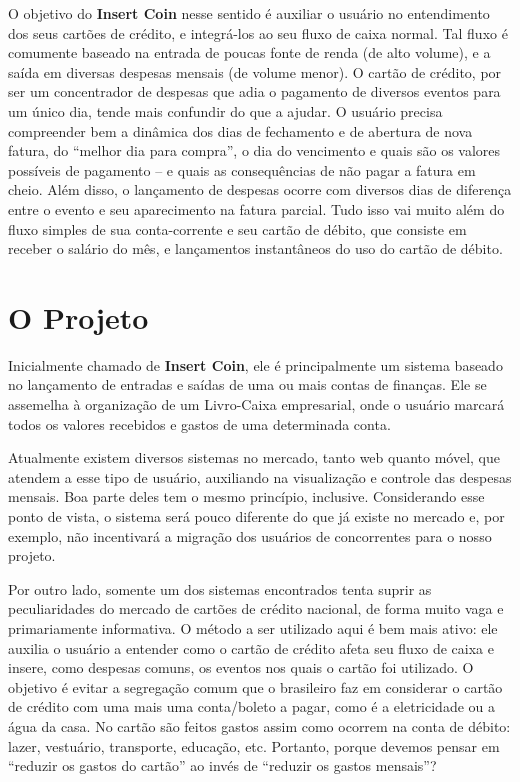 \documentclass[a4paper]{abnt}
\begin{document}
O objetivo do \textbf{Insert Coin} nesse sentido é auxiliar o usuário no entendimento dos seus cartões de crédito, e integrá-los ao seu fluxo de caixa normal. Tal fluxo é comumente baseado na entrada de poucas fonte de renda (de alto volume), e a saída em diversas despesas mensais (de volume menor). O cartão de crédito, por ser um concentrador de despesas que adia o pagamento de diversos eventos para um único dia, tende mais confundir do que a ajudar. O usuário precisa compreender bem a dinâmica dos dias de fechamento e de abertura de nova fatura, do “melhor dia para compra”, o dia do vencimento e quais são os valores possíveis de pagamento – e quais as consequências de não pagar a fatura em cheio. Além disso, o lançamento de despesas ocorre com diversos dias de diferença entre o evento e seu aparecimento na fatura parcial. Tudo isso vai muito além do fluxo simples de sua conta-corrente e seu cartão de débito, que consiste em receber o salário do mês, e lançamentos instantâneos do uso do cartão de débito.

\section{O Projeto}

Inicialmente chamado de \textbf{Insert Coin}, ele é principalmente um sistema baseado no lançamento de entradas e saídas de uma ou mais contas de finanças. Ele se assemelha à organização de um Livro-Caixa empresarial, onde o usuário marcará todos os valores recebidos e gastos de uma determinada conta. 

Atualmente existem diversos sistemas no mercado, tanto web quanto móvel, que atendem a esse tipo de usuário, auxiliando na visualização e controle das despesas mensais. Boa parte deles tem o mesmo princípio, inclusive. Considerando esse ponto de vista, o sistema será pouco diferente do que já existe no mercado e, por exemplo, não incentivará a migração dos usuários de concorrentes para o nosso projeto.

Por outro lado, somente um dos sistemas encontrados tenta suprir as peculiaridades do mercado de cartões de crédito nacional, de forma muito vaga e primariamente informativa. O método a ser utilizado aqui é bem mais ativo: ele auxilia o usuário a entender como o cartão de crédito afeta seu fluxo de caixa e insere, como despesas comuns, os eventos nos quais o cartão foi utilizado. O objetivo é evitar a segregação comum que o brasileiro faz em considerar o cartão de crédito com uma mais uma conta/boleto a pagar, como é a eletricidade ou a água da casa. No cartão são feitos gastos assim como ocorrem na conta de débito: lazer, vestuário, transporte, educação, etc. Portanto, porque devemos pensar em ``reduzir os gastos do cartão'' ao invés de ``reduzir os gastos mensais''?
\end{document}

